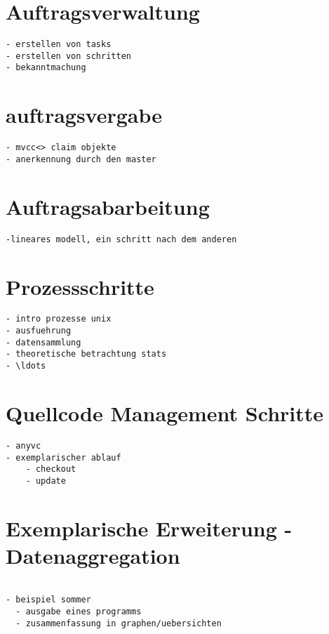 \section{Auftragsverwaltung}

\begin{verbatim}
- erstellen von tasks
- erstellen von schritten
- bekanntmachung
\end{verbatim}

\section{auftragsvergabe}

\begin{verbatim}
- mvcc<> claim objekte
- anerkennung durch den master

\end{verbatim}

\section{Auftragsabarbeitung}
\begin{verbatim}
-lineares modell, ein schritt nach dem anderen
\end{verbatim}

\section{Prozessschritte}

\begin{verbatim}
- intro prozesse unix
- ausfuehrung
- datensammlung
- theoretische betrachtung stats
- \ldots
\end{verbatim}

\section{Quellcode Management Schritte}


\begin{verbatim}
- anyvc
- exemplarischer ablauf
    - checkout
    - update
\end{verbatim}

\section{Exemplarische Erweiterung - Datenaggregation}

\begin{verbatim}

- beispiel sommer
  - ausgabe eines programms
  - zusammenfassung in graphen/uebersichten

\end{verbatim}

